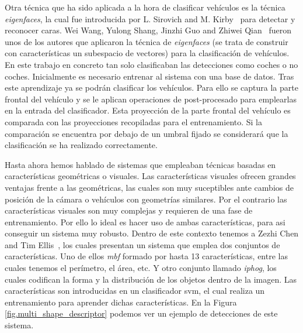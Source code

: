Otra técnica que ha sido aplicada a la hora de clasificar vehículos es la técnica \textit{eigenfaces}, la cual fue introducida por L. Sirovich and M. Kirby~\cite{low_dimensional} para detectar y reconocer caras. Wei Wang, Yulong Shang, Jinzhi Guo and Zhiwei Qian~\cite{real_time_vehicle} fueron unos de los autores que aplicaron la técnica de \textit{eigenfaces} (se trata de construir con características un subespacio de vectores) para la clasificación de vehículos. En este trabajo en concreto tan solo clasificaban las detecciones como coches o no coches. Inicialmente es necesario entrenar al sistema con una base de datos. Tras este aprendizaje ya se podrán clasificar los vehículos. Para ello se captura la parte frontal del vehículo y se le aplican operaciones de post-procesado para emplearlas en la entrada del clasificador. Esta proyección de la parte frontal del vehículo es comparada con las proyecciones recopiladas para el entrenamiento. Si la comparación se encuentra por debajo de un umbral fijado se considerará que la clasificación se ha realizado correctamente. 

Hasta ahora hemos hablado de sistemas que empleaban técnicas basadas en características geométricas o visuales. Las características visuales ofrecen grandes ventajas frente a las geométricas, las cuales son muy suceptibles ante cambios de posición de la cámara o vehículos con geometrías similares. Por el contrario las características visuales son muy complejas y requieren de una fase de entrenamiento. Por ello lo ideal es hacer uso de ambas características, para asi conseguir un sistema muy robusto. Dentro de este contexto tenemos a Zezhi Chen and Tim Ellis~\cite{multi_shape_descriptor}, los cuales presentan un sistema que emplea dos conjuntos de características. Uno de ellos \textit{\acrfull{mbf}} formado por hasta 13 características, entre las cuales tenemos el perímetro, el área, etc. Y otro conjunto llamado \textit{\acrfull{iphog}}, los cuales codifican la forma y la distribución de los objetos dentro de la imagen. Las características son introducidas en un clasificador \acrshort{svm}, el cual realiza un entrenamiento para aprender dichas características. En la Figura \ref{fig.multi_shape_descriptor} podemos ver un ejemplo de detecciones de este sistema.

